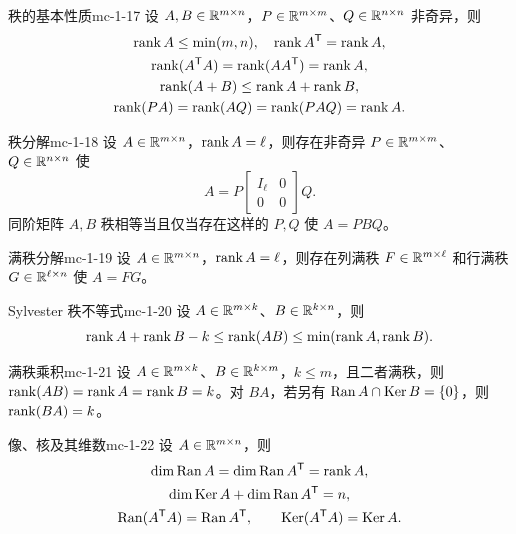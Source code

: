 \begin{theorem}{秩的基本性质}{mc-1-17}
设 $A,B\in\mathbb{R}^{m\times n}$，$P\in\mathbb{R}^{m\times m}$、$Q\in\mathbb{R}^{n\times n}$ 非奇异，则
\[
\begin{gathered}
\operatorname{rank} A\leq\min(m,n),\quad\operatorname{rank} A^{\mathsf T}=\operatorname{rank} A,\\
\operatorname{rank}(A^{\mathsf T}A)=\operatorname{rank}(AA^{\mathsf T})=\operatorname{rank} A,\\
\operatorname{rank}(A+B)\leq\operatorname{rank} A+\operatorname{rank} B,\\
\operatorname{rank}(PA)=\operatorname{rank}(AQ)=\operatorname{rank}(PAQ)=\operatorname{rank} A.
\end{gathered}
\]
\end{theorem}

\begin{theorem}{秩分解}{mc-1-18}
设 $A\in\mathbb{R}^{m\times n}$，$\operatorname{rank} A=\ell$，则存在非奇异 $P\in\mathbb{R}^{m\times m}$、$Q\in\mathbb{R}^{n\times n}$ 使
\[A=P\begin{bmatrix}I_\ell&0\\0&0\end{bmatrix}Q.\]
同阶矩阵 $A,B$ 秩相等当且仅当存在这样的 $P,Q$ 使 $A=PBQ$。
\end{theorem}

\begin{corollary}{满秩分解}{mc-1-19}
设 $A\in\mathbb{R}^{m\times n}$，$\operatorname{rank} A=\ell$，则存在列满秩 $F\in\mathbb{R}^{m\times\ell}$ 和行满秩 $G\in\mathbb{R}^{\ell\times n}$ 使 $A=FG$。
\end{corollary}

\begin{theorem}{Sylvester 秩不等式}{mc-1-20}
设 $A\in\mathbb{R}^{m\times k}$、$B\in\mathbb{R}^{k\times n}$，则
\[\operatorname{rank} A+\operatorname{rank} B-k\leq\operatorname{rank}(AB)\leq\min(\operatorname{rank} A,\operatorname{rank} B).\]
\end{theorem}

\begin{corollary}{满秩乘积}{mc-1-21}
设 $A\in\mathbb{R}^{m\times k}$、$B\in\mathbb{R}^{k\times m}$，$k\leq m$，且二者满秩，则 $\operatorname{rank}(AB)=\operatorname{rank} A=\operatorname{rank} B=k$。对 $BA$，若另有 $\operatorname{Ran} A\cap\operatorname{Ker} B=\{0\}$，则 $\operatorname{rank}(BA)=k$。
\end{corollary}

\begin{theorem}{像、核及其维数}{mc-1-22}
设 $A\in\mathbb{R}^{m\times n}$，则
\[
\begin{gathered}
\dim\operatorname{Ran} A=\dim\operatorname{Ran} A^{\mathsf T}=\operatorname{rank} A,\\
\dim\operatorname{Ker} A+\dim\operatorname{Ran} A^{\mathsf T}=n,\\
\operatorname{Ran}(A^{\mathsf T}A)=\operatorname{Ran} A^{\mathsf T},\qquad\operatorname{Ker}(A^{\mathsf T}A)=\operatorname{Ker} A.
\end{gathered}
\]
\end{theorem}

